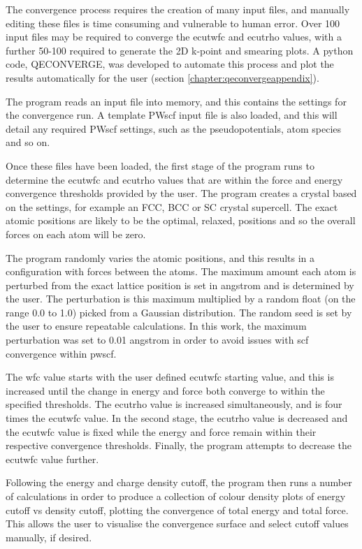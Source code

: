 The convergence process requires the creation of many input files, and manually editing these files is time consuming and vulnerable to human error. Over 100 input files may be required to converge the ecutwfc and ecutrho values, with a further 50-100 required to generate the 2D k-point and smearing plots.  A python code, QECONVERGE, was developed to automate this process and plot the results automatically for the user (section \ref{chapter:qeconvergeappendix}).

The program reads an input file into memory, and this contains the settings for the convergence run.  A template PWscf input file is also loaded, and this will detail any required PWscf settings, such as the pseudopotentials, atom species and so on.  

Once these files have been loaded, the first stage of the program runs to determine the ecutwfc and ecutrho values that are within the force and energy convergence thresholds provided by the user.  The program creates a crystal based on the settings, for example an FCC, BCC or SC crystal supercell.  The exact atomic positions are likely to be the optimal, relaxed, positions and so the overall forces on each atom will be zero.  

The program randomly varies the atomic positions, and this results in a configuration with forces between the atoms.  The maximum amount each atom is perturbed from the exact lattice position is set in angstrom and is determined by the user.  The perturbation is this maximum multiplied by a random float (on the range 0.0 to 1.0) picked from a Gaussian distribution.  The random seed is set by the user to ensure repeatable calculations.  In this work, the maximum perturbation was set to 0.01 angstrom in order to avoid issues with \acrshort{scf} convergence within \acrshort{pwscf}. 

The wfc value starts with the user defined ecutwfc starting value, and this is increased until the change in energy and force both converge to within the specified thresholds.  The ecutrho value is increased simultaneously, and is four times the ecutwfc value.  In the second stage, the ecutrho value is decreased and the ecutwfc value is fixed while the energy and force remain within their respective convergence thresholds.  Finally, the program attempts to decrease the ecutwfc value further.

Following the energy and charge density cutoff, the program then runs a number of calculations in order to produce a collection of colour density plots of energy cutoff vs density cutoff, plotting the convergence of total energy and total force.  This allows the user to visualise the convergence surface and select cutoff values manually, if desired.

